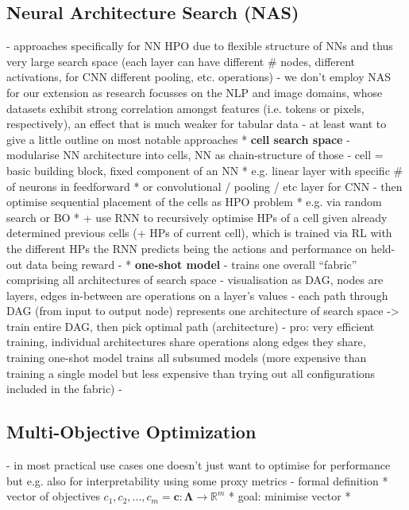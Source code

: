 \documentclass[twoside,11pt]{article}
\begin{document}
\subsection{Neural Architecture Search (NAS)}
- approaches specifically for NN HPO due to flexible structure of NNs and thus very large search space (each layer can have different \# nodes, different activations, for CNN different pooling, etc. operations)
- we don't employ NAS for our extension as research focusses on the NLP and image domains, %
  whose datasets exhibit strong correlation amongst features (i.e. tokens or pixels, respectively), an effect that is much weaker for tabular data \citep[p. 7499]{Borisov_2024}
- at least want to give a little outline on most notable approaches
  * \textbf{cell search space}
    - modularise NN architecture into cells, NN as chain-structure of those
    - cell = basic building block, fixed component of an NN
      * e.g. linear layer with specific \# of neurons in feedforward
      * or convolutional / pooling / etc layer for CNN
    - then optimise sequential placement of the cells as HPO problem
      * e.g. via random search or BO
      * \citet[p. 3]{zoph2017neuralarchitecturesearchreinforcement} + \citet[pp. 2-4]{Zoph_2018_CVPR} use RNN to recursively optimise HPs of a cell given already determined
        previous cells (+ HPs of current cell), which is trained via RL with the different HPs the RNN predicts being the actions and performance on held-out data being reward
    - \citep[chap. 3.2]{elsken_neural_2019}
  * \textbf{one-shot model}
    - trains one overall ``fabric'' comprising all architectures of search space
    - visualisation as DAG, nodes are layers, edges in-between are operations on a layer's values
    - each path through DAG (from input to output node) represents one architecture of search space -> train entire DAG, then pick optimal path (architecture)
    - pro: very efficient training, individual architectures share operations along edges they share, training one-shot model trains all subsumed models (more expensive
      than training a single model but less expensive than trying out all configurations included in the fabric)
    - \citep[pp. 1-2, p.8]{saxena2017convolutionalneuralfabrics}

\subsection{Multi-Objective Optimization}
- in most practical use cases one doesn't just want to optimise for performance but e.g. also for interpretability using some proxy metrics
- formal definition
  * vector of objectives $c_1,c_2,...,c_m=\boldsymbol{c}:\boldsymbol\Lambda\rightarrow\mathbb{R}^m$
  * goal: minimise vector
  * \citep[p. 11]{10.1145/3610536}
\end{document}
